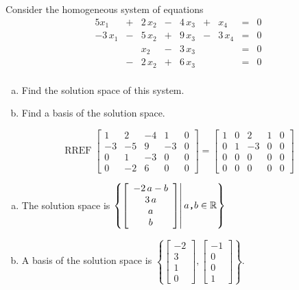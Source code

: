 
\begin{exerciseStatement}


Consider the homogeneous system of equations 
\begin{alignat*}{5} x_{1} &+& 2 \, x_{2} &-& 4 \, x_{3} &+& x_{4} &=& 0 \\-3 \, x_{1} &-& 5 \, x_{2} &+& 9 \, x_{3} &-& 3 \, x_{4} &=& 0 \\ & & x_{2} &-& 3 \, x_{3} & &  &=& 0 \\ &-& 2 \, x_{2} &+& 6 \, x_{3} & &  &=& 0 \\ \end{alignat*}
            


\begin{enumerate}[(a)]
\item  Find the solution space of this system.
\item  Find a basis of the solution space.
\end{enumerate}
    
\end{exerciseStatement}
    
\begin{exerciseAnswer} 


\[\operatorname{RREF} \left[\begin{array}{cccc|c}
1 & 2 & -4 & 1 & 0 \\
-3 & -5 & 9 & -3 & 0 \\
0 & 1 & -3 & 0 & 0 \\
0 & -2 & 6 & 0 & 0
\end{array}\right] = \left[\begin{array}{cccc|c}
1 & 0 & 2 & 1 & 0 \\
0 & 1 & -3 & 0 & 0 \\
0 & 0 & 0 & 0 & 0 \\
0 & 0 & 0 & 0 & 0
\end{array}\right] \]


\begin{enumerate}[(a)]
\item The solution space is \( \left\{ \left[\begin{array}{c}
-2 \, a - b \\
3 \, a \\
a \\
b
\end{array}\right] \middle|\,a\text{\texttt{,}}b\in\mathbb{R}\right\} \)
\item A basis of the solution space is \( \left\{ \left[\begin{array}{c}
-2 \\
3 \\
1 \\
0
\end{array}\right] , \left[\begin{array}{c}
-1 \\
0 \\
0 \\
1
\end{array}\right] \right\} \).
\end{enumerate}
    
\end{exerciseAnswer}
    
